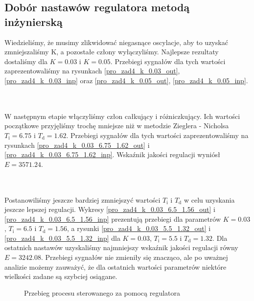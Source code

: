 \subsection{Dobór nastawów regulatora metodą inżynierską}
Wiedzieliśmy, że musimy zlikwidować niegasnące oscylacje, aby to uzyskać zmniejszaliśmy K, a pozostałe człony wyłączyliśmy. Najlepsze rezultaty dostaliśmy dla $ K = \num{0.03} $ i $ K = \num{0.05} $. Przebiegi sygnałów dla tych wartości zaprezentowaliśmy na rysunkach \ref{pro_zad4_k_0.03_out}, \ref{pro_zad4_k_0.03_inp} oraz \ref{pro_zad4_k_0.05_out}, \ref{pro_zad4_k_0.05_inp}.

~\\\\ W następnym etapie włączyliśmy człon całkujący i różniczkujący. Ich wartości początkowe przyjęliśmy trochę mniejsze niż w metodzie Zieglera - Nicholsa $T_{\mathrm{i}} = \num{6.75}$ i $T_{\mathrm{d}} = \num{1.62}$. Przebiegi sygnałów dla tych wartości zaprezentowaliśmy na rysunkach \ref{pro_zad4_k_0.03_6.75_1.62_out} i \ref{pro_zad4_k_0.03_6.75_1.62_inp}. Wskaźnik jakości regulacji wyniósł $E = \num{3571.24}$. 

~\\\\ Postanowiliśmy jeszcze bardziej zmniejszyć wartości $T_{\mathrm{i}}$ i $T_{\mathrm{d}}$ w celu uzyskania jeszcze lepszej regulacji. Wykresy \ref{pro_zad4_k_0.03_6.5_1.56_out} i \ref{pro_zad4_k_0.03_6.5_1.56_inp} prezentują przebiegi dla parametrów $K = \num{0,03}$, $T_{\mathrm{i}} = \num{6.5}$ i $T_{\mathrm{d}} = \num{1.56}$, a rysunki \ref{pro_zad4_k_0.03_5.5_1.32_out} i \ref{pro_zad4_k_0.03_5.5_1.32_inp} dla $K = \num{0,03}$, $T_{\mathrm{i}} = \num{5.5}$ i $T_{\mathrm{d}} = \num{1.32}$. Dla ostatnich nastawów uzyskaliśmy najmniejszy wskaźnik jakości regulacji równy $E = \num{3242.08}$. Przebiegi sygnałów nie zmieniły się znacząco, ale po uważnej analizie możemy zauważyć, że dla ostatnich wartości parametrów niektóre wielkości zadane są szybciej osiągane. 


\begin{figure}[t]
    \centering
    \caption{Przebieg procesu sterowanego za pomocą regulatora}
    \label{pro_zad4_niegasnace_oscylacje_out}
\end{figure}


